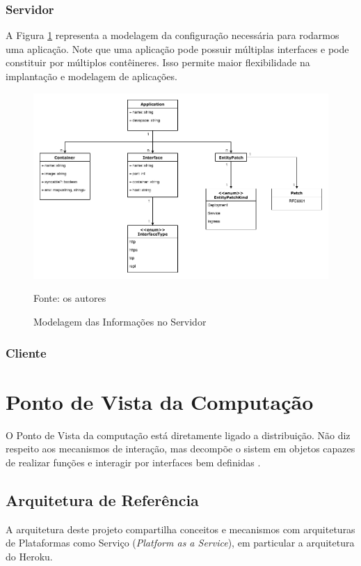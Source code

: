 \documentclass[twosideprint]{politex}
\newcommand{\legend}[1]{\begin{center}\def\caption{}\caption{#1}\end{center}}
\begin{document}
	        \subsubsection{Servidor}
	        A Figura \ref{fig:info-server} representa a modelagem da configuração necessária para rodarmos uma aplicação. Note que uma aplicação pode possuir múltiplas interfaces e pode constituir por múltiplos contêineres. Isso permite maior flexibilidade na implantação e modelagem de aplicações.
	        \begin{figure}[htb]
        	    \centering
        	    \caption{Modelagem das Informações no Servidor}
        	    \includegraphics[scale=0.40]{pictures/especificacao-de-requisitos/info-server.png}
        	    \legend{Fonte: os autores}
        	    \label{fig:info-server}
	        \end{figure}
	        \subsubsection{Cliente}
	            
	\section{Ponto de Vista da Computação}
	    O Ponto de Vista da computação está diretamente ligado a distribuição. Não diz respeito aos mecanismos de interação, mas decompõe o sistem em objetos capazes de realizar funções e interagir por interfaces bem definidas \cite{odppart1}.
	    \subsection{Arquitetura de Referência}
	        A arquitetura deste projeto compartilha conceitos e mecanismos com arquiteturas de Plataformas como Serviço (\textit{Platform as a Service}), em particular a arquitetura do Heroku.
	        
\end{document}
